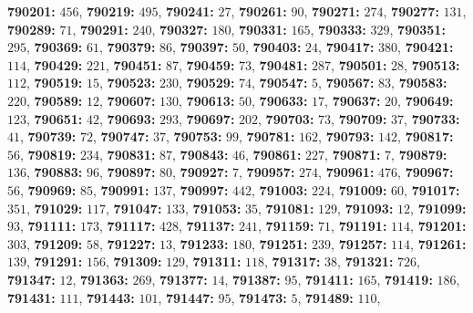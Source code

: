 \textsf{\bfseries 790201:} $456$, \textsf{\bfseries 790219:} $495$, \textsf{\bfseries 790241:} $27$, \textsf{\bfseries 790261:} $90$, \textsf{\bfseries 790271:} $274$, \textsf{\bfseries 790277:} $131$, \textsf{\bfseries 790289:} $71$, \textsf{\bfseries 790291:} $240$, \textsf{\bfseries 790327:} $180$, \textsf{\bfseries 790331:} $165$, \textsf{\bfseries 790333:} $329$, \textsf{\bfseries 790351:} $295$, \textsf{\bfseries 790369:} $61$, \textsf{\bfseries 790379:} $86$, \textsf{\bfseries 790397:} $50$, \textsf{\bfseries 790403:} $24$, \textsf{\bfseries 790417:} $380$, \textsf{\bfseries 790421:} $114$, \textsf{\bfseries 790429:} $221$, \textsf{\bfseries 790451:} $87$, \textsf{\bfseries 790459:} $73$, \textsf{\bfseries 790481:} $287$, \textsf{\bfseries 790501:} $28$, \textsf{\bfseries 790513:} $112$, \textsf{\bfseries 790519:} $15$, \textsf{\bfseries 790523:} $230$, \textsf{\bfseries 790529:} $74$, \textsf{\bfseries 790547:} $5$, \textsf{\bfseries 790567:} $83$, \textsf{\bfseries 790583:} $220$, \textsf{\bfseries 790589:} $12$, \textsf{\bfseries 790607:} $130$, \textsf{\bfseries 790613:} $50$, \textsf{\bfseries 790633:} $17$, \textsf{\bfseries 790637:} $20$, \textsf{\bfseries 790649:} $123$, \textsf{\bfseries 790651:} $42$, \textsf{\bfseries 790693:} $293$, \textsf{\bfseries 790697:} $202$, \textsf{\bfseries 790703:} $73$, \textsf{\bfseries 790709:} $37$, \textsf{\bfseries 790733:} $41$, \textsf{\bfseries 790739:} $72$, \textsf{\bfseries 790747:} $37$, \textsf{\bfseries 790753:} $99$, \textsf{\bfseries 790781:} $162$, \textsf{\bfseries 790793:} $142$, \textsf{\bfseries 790817:} $56$, \textsf{\bfseries 790819:} $234$, \textsf{\bfseries 790831:} $87$, \textsf{\bfseries 790843:} $46$, \textsf{\bfseries 790861:} $227$, \textsf{\bfseries 790871:} $7$, \textsf{\bfseries 790879:} $136$, \textsf{\bfseries 790883:} $96$, \textsf{\bfseries 790897:} $80$, \textsf{\bfseries 790927:} $7$, \textsf{\bfseries 790957:} $274$, \textsf{\bfseries 790961:} $476$, \textsf{\bfseries 790967:} $56$, \textsf{\bfseries 790969:} $85$, \textsf{\bfseries 790991:} $137$, \textsf{\bfseries 790997:} $442$, \textsf{\bfseries 791003:} $224$, \textsf{\bfseries 791009:} $60$, \textsf{\bfseries 791017:} $351$, \textsf{\bfseries 791029:} $117$, \textsf{\bfseries 791047:} $133$, \textsf{\bfseries 791053:} $35$, \textsf{\bfseries 791081:} $129$, \textsf{\bfseries 791093:} $12$, \textsf{\bfseries 791099:} $93$, \textsf{\bfseries 791111:} $173$, \textsf{\bfseries 791117:} $428$, \textsf{\bfseries 791137:} $241$, \textsf{\bfseries 791159:} $71$, \textsf{\bfseries 791191:} $114$, \textsf{\bfseries 791201:} $303$, \textsf{\bfseries 791209:} $58$, \textsf{\bfseries 791227:} $13$, \textsf{\bfseries 791233:} $180$, \textsf{\bfseries 791251:} $239$, \textsf{\bfseries 791257:} $114$, \textsf{\bfseries 791261:} $139$, \textsf{\bfseries 791291:} $156$, \textsf{\bfseries 791309:} $129$, \textsf{\bfseries 791311:} $118$, \textsf{\bfseries 791317:} $38$, \textsf{\bfseries 791321:} $726$, \textsf{\bfseries 791347:} $12$, \textsf{\bfseries 791363:} $269$, \textsf{\bfseries 791377:} $14$, \textsf{\bfseries 791387:} $95$, \textsf{\bfseries 791411:} $165$, \textsf{\bfseries 791419:} $186$, \textsf{\bfseries 791431:} $111$, \textsf{\bfseries 791443:} $101$, \textsf{\bfseries 791447:} $95$, \textsf{\bfseries 791473:} $5$, \textsf{\bfseries 791489:} $110$, 
